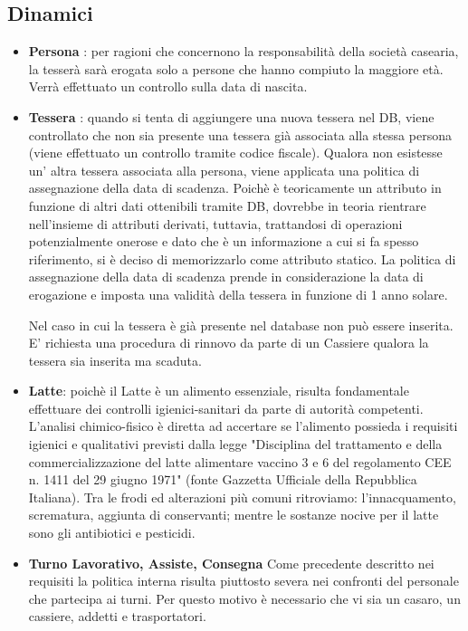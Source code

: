 \documentclass[12pt]{report}
\begin{document}
\subsection{Dinamici}

\begin{itemize}

\item \textbf{Persona} : per ragioni che concernono la responsabilità della società casearia, la tesserà sarà erogata solo a persone che hanno compiuto la maggiore età. Verrà effettuato un controllo sulla data di nascita.

\item \textbf{Tessera} : quando si tenta di aggiungere una nuova tessera nel DB, viene controllato che non sia presente una tessera già associata alla stessa persona (viene effettuato un controllo tramite codice fiscale). Qualora non esistesse un' altra tessera associata alla persona, viene applicata una politica di assegnazione della data di scadenza. Poichè è teoricamente un attributo in funzione di altri dati ottenibili tramite DB, dovrebbe in teoria rientrare nell'insieme di attributi derivati, tuttavia, trattandosi di operazioni potenzialmente onerose e dato che è un informazione a cui si fa spesso riferimento, si è deciso di memorizzarlo come attributo statico.
La politica di assegnazione della data di scadenza prende in considerazione la data di erogazione e imposta una validità della tessera in funzione di 1 anno solare.

Nel caso in cui la tessera è già presente nel database non può essere inserita. E' richiesta una procedura di rinnovo da parte di un Cassiere qualora la tessera sia inserita ma scaduta.
\item \textbf{Latte}: poichè il Latte è un alimento essenziale, risulta fondamentale effettuare dei controlli igienici-sanitari da parte di autorità competenti. L'analisi chimico-fisico è diretta ad accertare se l'alimento possieda i requisiti igienici e qualitativi previsti dalla legge "Disciplina del trattamento e della commercializzazione del latte alimentare vaccino 3 e 6 del regolamento CEE  n.
1411 del 29 giugno 1971" (fonte Gazzetta Ufficiale della Repubblica Italiana).
Tra le frodi ed alterazioni più comuni ritroviamo: l'innacquamento, scrematura, aggiunta di conservanti; mentre le sostanze nocive per il latte sono gli antibiotici e pesticidi. 

\item \textbf{Turno Lavorativo, Assiste, Consegna} Come precedente descritto nei requisiti la politica interna risulta piuttosto severa nei confronti del personale che partecipa ai turni. Per questo motivo è necessario che vi sia un casaro, un cassiere, addetti e trasportatori.


\end{itemize}
\end{document}
